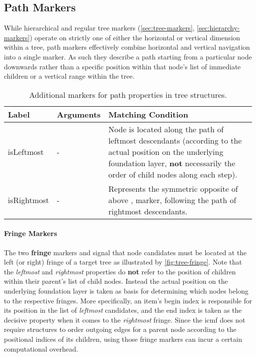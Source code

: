 \documentclass[11pt,a4paper]{report}
\begin{document}
\subsection{Path Markers}
\label{sec:path-markers}

While hierarchical and regular tree markers (\ref{sec:tree-markers}, \ref{sec:hierarchy-markers}) operate on strictly one of either the horizontal or vertical dimension within a tree, path markers effectively combine horizontal and vertical navigation into a single marker.
As such they describe a path starting from a particular node downwards rather than a specific position within that node's list of immediate children or a vertical range within the tree.

\begin{table}[!htb]\centering
	\begin{tabular}{|p{}|p{}|p{}|}
		\hline 
		\textbf{Label} & \textbf{Arguments} & \textbf{Matching Condition} \\ 
		\hline 
		\hline 
		isLeftmost & - & Node is located along the path of leftmost descendants (according to the actual position on the underlying foundation layer, \textbf{not} necessarily the order of child nodes along each step). \\  
		\hline 
		isRightmost & - & Represents the symmetric opposite of above \query{isLeftmost}, marker, following the path of rightmost descendants. \\  
		\hline 
	\end{tabular}
	\caption[Path markers]{Additional markers for path properties in tree structures.}
	\label{tab:tree-path-markers}
\end{table}

\paragraph{Fringe Markers}
\noindent The two \textbf{fringe} markers  and  signal that node candidates must be located at the left (or right) fringe of a target tree as illustrated by \cref{fig:tree-fringe}.
Note that the \textit{leftmost} and \textit{rightmost} properties do \textbf{not} refer to the position of children within their parent's list of child nodes.
Instead the actual position on the underlying foundation layer is taken as basis for determining which nodes belong to the respective fringes.
More specifically, an item's begin index is responsible for its position in the list of \textit{leftmost} candidates, and the end index is taken as the decisive property when it comes to the \textit{rightmost} fringe.
Since the \ac{icmf} does not require structures to order outgoing edges for a parent node according to the positional indices of its children, using those fringe markers can incur a certain computational overhead.
\end{document}
